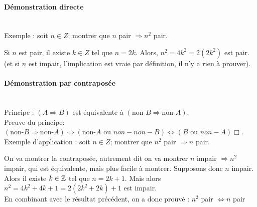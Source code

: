 {\paragraph{Démonstration directe}$ $\\
\\
Exemple : soit $n \in Z$; montrer que \og $n$ pair $\Rightarrow n^2$ pair\fg.\\
\begin{red} Si $n$ est pair, il existe $k \in Z$ tel que $n = 2k$. Alors, $n^2 = 4k^2 = 2(2k^2)$ est pair. (et si $n$ est impair, l'implication est vraie par définition, il n'y a rien à prouver).\end{red}

\paragraph{Démonstration par contraposée}$ $\\
\\
Principe : $(A\Rightarrow B)$ est équivalente à $(\text{non-}B \Rightarrow \text{non-}A)$.\\
Preuve du principe: $(\text{non-}B \Rightarrow \text{non-}A)\Leftrightarrow (\text{non-}A \text{ ou } non-non-B)\Leftrightarrow (B\text{ ou }non-A)\Box$.\\
Exemple d'application : soit $n\in Z$; montrer que $n^2$ pair $\Rightarrow n$ pair.\\
\begin{red} On va montrer la contraposée, autrement dit on va montrer 
\og $n$ impair $\Rightarrow n^2$ impair\fg, qui est équivalente, mais plus facile à montrer. Supposons donc $n$ impair. Alors il existe $k \in\mathbb{Z}$ tel que $n = 2k+1$. Mais alors $n^2 = 4k^2+4k+1 = 2(2k^2+2k)+1$ est impair.\\
En combinant avec le résultat précédent, on a donc prouvé : \og$n^2$ pair $\Leftrightarrow n$ pair\fg\end{red}

}
